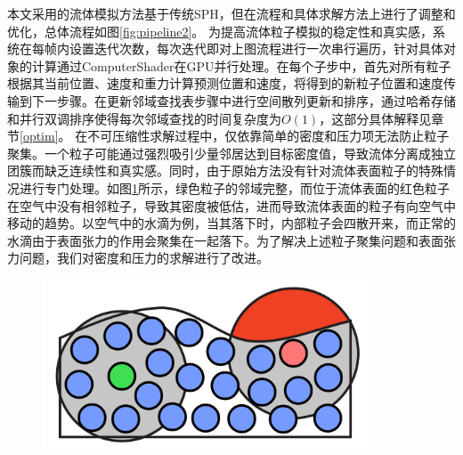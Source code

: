 本文采用的流体模拟方法基于传统SPH，但在流程和具体求解方法上进行了调整和优化，总体流程如图\ref{fig:pipeline2}。
为提高流体粒子模拟的稳定性和真实感，系统在每帧内设置迭代次数，每次迭代即对上图流程进行一次串行遍历，针对具体对象的计算通过ComputerShader在GPU并行处理。在每个子步中，首先对所有粒子根据其当前位置、速度和重力计算预测位置和速度，将得到的新粒子位置和速度传输到下一步骤。在更新邻域查找表步骤中进行空间散列更新和排序，通过哈希存储和并行双调排序使得每次邻域查找的时间复杂度为$O(1)$，这部分具体解释见章节\ref{optim}。
在不可压缩性求解过程中，仅依靠简单的密度和压力项无法防止粒子聚集。一个粒子可能通过强烈吸引少量邻居达到目标密度值，导致流体分离成独立团簇而缺乏连续性和真实感。同时，由于原始方法没有针对流体表面粒子的特殊情况进行专门处理。如图\ref{fig:surface}所示，绿色粒子的邻域完整，而位于流体表面的红色粒子在空气中没有相邻粒子，导致其密度被低估，进而导致流体表面的粒子有向空气中移动的趋势。以空气中的水滴为例，当其落下时，内部粒子会四散开来，而正常的水滴由于表面张力的作用会聚集在一起落下。为了解决上述粒子聚集问题和表面张力问题，我们对密度和压力的求解进行了改进。
\begin{figure}[ht]
 \centering
 \includegraphics[height=5cm]{image/bounder.png}
 \label{fig:surface}
\end{figure}


